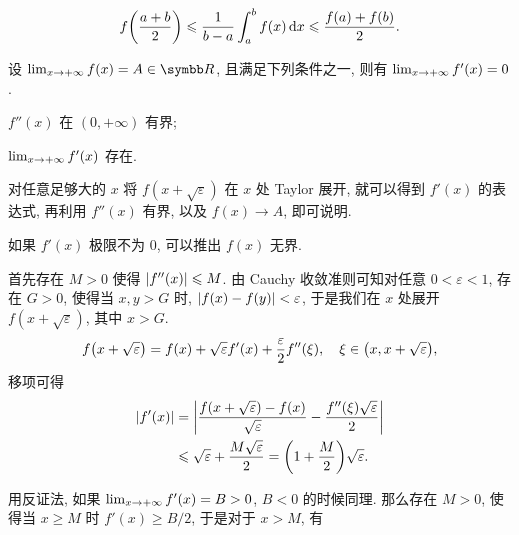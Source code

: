 \begin{exercise}[series=exer]
    \begin{align*}
        f\qty(\frac{a+b}{2}) \leqslant \frac{1}{b - a}\int_{a}^{b} f(x) \dd{x} \leqslant \frac{f(a) + f(b)}{2}.
    \end{align*}
    \item 设 $ \limit{x}{+\infty} f(x) = A \in \R $, 且满足下列条件之一, 则有 $ \lim_{x \to +\infty} f'(x) = 0 $.
    \begin{exercise}
        \item $ f''(x) $ 在 $ (0, +\infty) $ 有界;
        \item $ \lim_{x \to +\infty} f'(x) $ 存在.
    \end{exercise}
    \begin{hint}
        \begin{hintsheet}
            \item 对任意足够大的 $ x $ 将 $ f(x+\sqrt{\varepsilon}) $ 在 $ x $ 处 Taylor 展开, 就可以得到 $ f'(x) $ 的表达式, 再利用 $ f''(x) $ 有界, 以及 $ f(x) \to A $, 即可说明.
            \item 如果 $ f'(x) $ 极限不为 $ 0 $, 可以推出 $ f(x) $ 无界. 
        \end{hintsheet}
    \end{hint}
    \begin{answer}
        \begin{answersheet}
            \item 首先存在 $ M > 0 $ 使得 $ \abs{f''(x)} \leqslant M $. 由 Cauchy 收敛准则可知对任意 $ 0 < \varepsilon < 1 $, 存在 $ G > 0 $, 使得当 $ x, y > G $ 时, $ \abs{f(x) - f(y)} < \varepsilon $, 于是我们在 $ x $ 处展开 $ f(x + \sqrt{\varepsilon}) $, 其中 $ x > G $.
            \begin{align*}
                f\qty(x + \sqrt{\varepsilon}) = f(x) + \sqrt{\varepsilon}f'(x) + \frac{\varepsilon}{2}f''(\xi),\quad \xi \in \qty(x, x + \sqrt{\varepsilon}),
            \end{align*}
            移项可得 
            \begin{align*}
                \abs{f'(x)} & = \abs{\frac{f\qty(x + \sqrt{\varepsilon}) - f(x)}{\sqrt{\varepsilon}} - \frac{f''(\xi)\sqrt{\varepsilon}}{2}}\\
                & \leqslant \sqrt{\varepsilon} + \frac{M\sqrt{\varepsilon}}{2} = \qty(1 + \frac{M}{2})\sqrt{\varepsilon}.
            \end{align*}
            \item 用反证法, 如果 $ \lim_{x \to +\infty} f'(x) = B > 0 $, $ B < 0 $ 的时候同理. 那么存在 $ M > 0 $, 使得当 $ x \ge M $ 时 $ f'(x) \ge B/2 $, 于是对于 $ x > M $, 有

\end{answersheet}
\end{answer}
\end{exercise}
